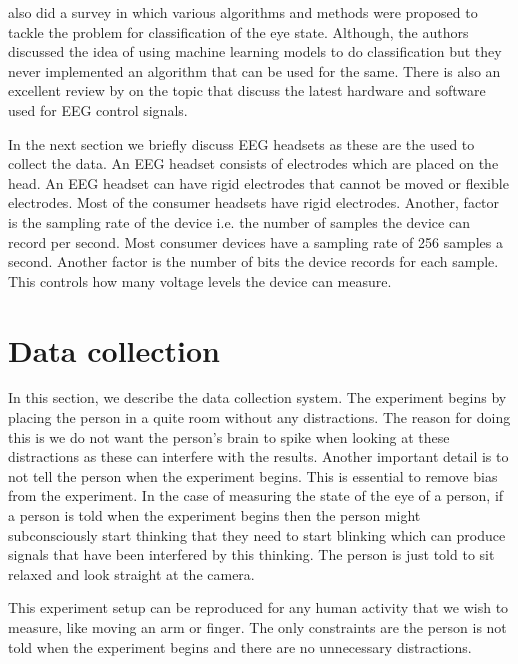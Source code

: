 \documentclass[10pt,twocolumn,letterpaper]{article}
\begin{document}
\cite{paper3} also did a survey in which various algorithms and methods were proposed to tackle the problem for classification of the eye state. Although, the authors discussed the idea of using machine learning models to do classification but they never implemented an algorithm that can be used for the same. There is also an excellent review by \cite{paper4} on the topic that discuss the latest hardware and software used for EEG control signals.

In the next section we briefly discuss EEG headsets as these are the used to collect the data. An EEG headset consists of electrodes which are placed on the head. An EEG headset can have rigid electrodes that cannot be moved or flexible electrodes. Most of the consumer headsets have rigid electrodes. Another, factor is the sampling rate of the device i.e. the number of samples the device can record per second. Most consumer devices have a sampling rate of 256 samples a second. Another factor is the number of bits the device records for each sample. This controls how many voltage levels the device can measure.

\section{Data collection}

In this section, we describe the data collection system. The experiment begins by placing the person in a quite room without any distractions. The reason for doing this is we do not want the person's brain to spike when looking at these distractions as these can interfere with the results. Another important detail is to not tell the person when the experiment begins. This is essential to remove bias from the experiment. In the case of measuring the state of the eye of a person, if a person is told when the experiment begins then the person might subconsciously start thinking that they need to start blinking which can produce signals that have been interfered by this thinking. The person is just told to sit relaxed and look straight at the camera.

This experiment setup can be reproduced for any human activity that we wish to measure, like moving an arm or finger. The only constraints are the person is not told when the experiment begins and there are no unnecessary distractions.
\end{document}
